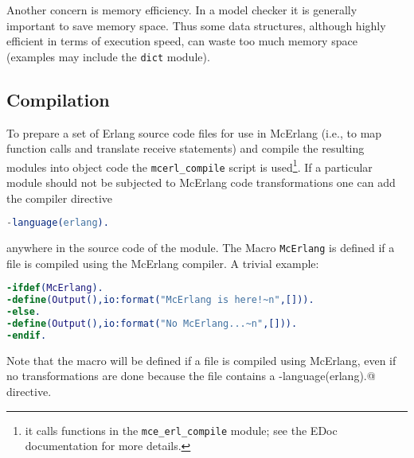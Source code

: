 \documentclass[a4paper]{article}
\begin{document}
Another concern is memory efficiency. In a model checker it is generally
important to save memory space. Thus some data structures, although
highly efficient in terms of execution speed, 
can waste too much memory space (examples may include the \lstinline{dict}
module).

\subsection{Compilation}

To prepare a set of Erlang source code files for use in McErlang
(i.e., to map function calls and translate receive statements) and
compile the resulting modules into object code the
\texttt{mcerl\_compile} script is used\footnote{it calls
functions in the \lstinline{mce_erl_compile} module; see the
EDoc documentation for more details.}.
If a particular module should not be subjected to McErlang 
code transformations one can add the compiler directive 
\begin{lstlisting}[language=Erlang]
-language(erlang).
\end{lstlisting}
anywhere in the source code of the module.
The Macro \lstinline{McErlang} is defined if a file is compiled
using the McErlang compiler.
A trivial example:
\begin{lstlisting}[language=Erlang]
-ifdef(McErlang).
-define(Output(),io:format("McErlang is here!~n",[])).
-else.
-define(Output(),io:format("No McErlang...~n",[])).
-endif.
\end{lstlisting}
Note that the \lstinline@McErlang@ macro will be defined if
a file is compiled using McErlang, even if no transformations
are done because the file contains a \lstinline@-language(erlang).@
directive.
\end{document}
